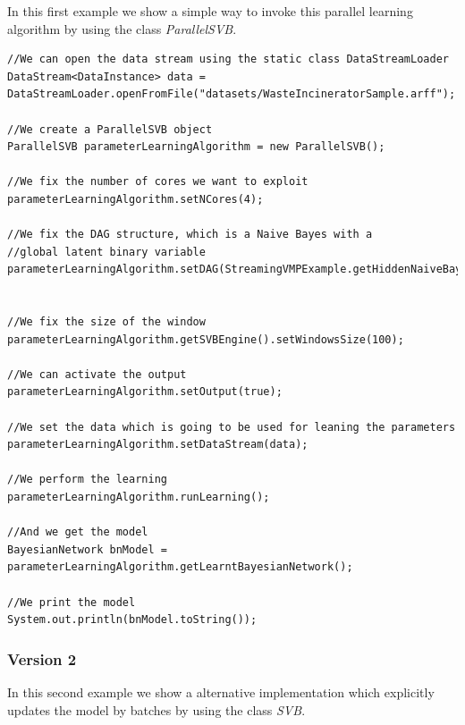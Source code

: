 In this first example we show a simple way to invoke this parallel learning algorithm by using the class \textit{ParallelSVB}.


\begin{lstlisting}
//We can open the data stream using the static class DataStreamLoader
DataStream<DataInstance> data = DataStreamLoader.openFromFile("datasets/WasteIncineratorSample.arff");

//We create a ParallelSVB object
ParallelSVB parameterLearningAlgorithm = new ParallelSVB();

//We fix the number of cores we want to exploit
parameterLearningAlgorithm.setNCores(4);

//We fix the DAG structure, which is a Naive Bayes with a 
//global latent binary variable
parameterLearningAlgorithm.setDAG(StreamingVMPExample.getHiddenNaiveBayesStructure(data));


//We fix the size of the window
parameterLearningAlgorithm.getSVBEngine().setWindowsSize(100);

//We can activate the output
parameterLearningAlgorithm.setOutput(true);

//We set the data which is going to be used for leaning the parameters
parameterLearningAlgorithm.setDataStream(data);

//We perform the learning
parameterLearningAlgorithm.runLearning();

//And we get the model
BayesianNetwork bnModel = parameterLearningAlgorithm.getLearntBayesianNetwork();

//We print the model
System.out.println(bnModel.toString());

\end{lstlisting}


\subsubsection*{Version 2}

In this second example we show a alternative implementation which explicitly updates the model by batches by using the class \textit{SVB}.


